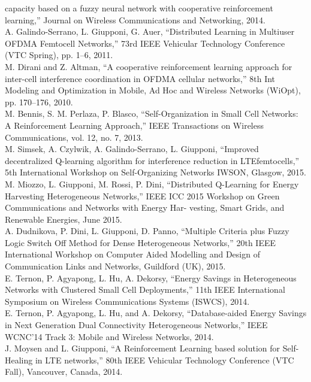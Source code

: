 \documentclass[12pt]{article}
\begin{document}
\begin{multicols}{2}
capacity based on a fuzzy neural network with cooperative reinforcement
learning,” Journal on Wireless Communications and Networking,
2014.
\\ \noindent [155] A. Galindo-Serrano, L. Giupponi, G. Auer, “Distributed Learning
in Multiuser OFDMA Femtocell Networks,” 73rd IEEE Vehicular
Technology Conference (VTC Spring), pp. 1–6, 2011.
\\ \noindent [156] M. Dirani and Z. Altman, “A cooperative reinforcement learning
approach for inter-cell interference coordination in OFDMA cellular
networks,” 8th Int Modeling and Optimization in Mobile, Ad Hoc and
Wireless Networks (WiOpt), pp. 170–176, 2010.
\\ \noindent [157] M. Bennis, S. M. Perlaza, P. Blasco, “Self-Organization in Small Cell
Networks: A Reinforcement Learning Approach,” IEEE Transactions
on Wireless Communications, vol. 12, no. 7, 2013.
\\ \noindent [158] M. Simsek, A. Czylwik, A. Galindo-Serrano, L. Giupponi, “Improved
decentralized Q-learning algorithm for interference reduction in LTEfemtocells,”
5th International Workshop on Self-Organizing Networks
IWSON, Glasgow, 2015.
\\ \noindent [159] M. Miozzo, L. Giupponi, M. Rossi, P. Dini, “Distributed Q-Learning
for Energy Harvesting Heterogeneous Networks,” IEEE ICC 2015
Workshop on Green Communications and Networks with Energy Har-
vesting, Smart Grids, and Renewable Energies, June 2015.
\\ \noindent [160] A. Dudnikova, P. Dini, L. Giupponi, D. Panno, “Multiple Criteria plus
Fuzzy Logic Switch Off Method for Dense Heterogeneous Networks,”
20th IEEE International Workshop on Computer Aided Modelling and
Design of Communication Links and Networks, Guildford (UK), 2015.
\\ \noindent [161] E. Ternon, P. Agyapong, L. Hu, A. Dekorsy, “Energy Savings in Heterogeneous
Networks with Clustered Small Cell Deployments,” 11th
IEEE International Symposium on Wireless Communications Systems
(ISWCS), 2014.
\\ \noindent [162] E. Ternon, P. Agyapong, L. Hu, and A. Dekorsy, “Database-aided
Energy Savings in Next Generation Dual Connectivity Heterogeneous
Networks,” IEEE WCNC’14 Track 3: Mobile and Wireless Networks,
2014.
\\ \noindent [163] J. Moysen and L. Giupponi, “A Reinforcement Learning based solution
for Self-Healing in LTE networks,” 80th IEEE Vehicular Technology
Conference (VTC Fall), Vancouver, Canada, 2014.

\end{multicols}
\end{document}
